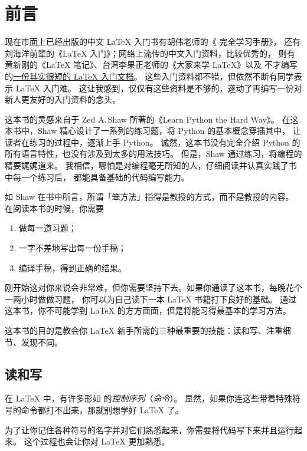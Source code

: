 \chapter{前言}
\label{chap:preface}
现在市面上已经出版的中文 \LaTeX{} 入门书有胡伟老师的《\LaTeXe{} 完全学习手册》，
还有刘海洋前辈的《\LaTeX{} 入门》；网络上流传的中文入门资料，比较优秀的，
则有黄新刚的《\LaTeX{} 笔记》、台湾李果正老师的《大家来学 \LaTeX{}》以及
不才编写的\href{http://liam0205.me/2014/09/08/latex-introduction/}%
  {\uline{一份其实很短的 \LaTeX{} 入门文档}}。
这些入门资料都不错，但依然不断有同学表示 \LaTeX{} 入门难。
这让我感到，仅仅有这些资料是不够的，遂动了再编写一份对新人更友好的入门资料的念头。

这本书的灵感来自于 Zed A.\,Shaw 所著的《Learn Python the Hard Way》。
在这本书中，Shaw 精心设计了一系列的练习题，将 Python 的基本概念穿插其中，
让读者在练习的过程中，逐渐上手 Python。
诚然，这本书没有完全介绍 Python 的所有语言特性，也没有涉及到太多的用法技巧。
但是，Shaw 通过练习，将编程的精要娓娓道来。
我相信，哪怕是对编程毫无所知的人，仔细阅读并认真实践了书中每一个练习后，
都能具备基础的代码编写能力。

如 Shaw 在书中所言，所谓「笨方法」指得是教授的方式，而不是教授的内容。
在阅读本书的时候，你需要
\begin{enumerate}
  \item 做每一道习题；
  \item 一字不差地写出每一份手稿；
  \item 编译手稿，得到正确的结果。
\end{enumerate}
刚开始这对你来说会非常难，但你需要坚持下去。如果你通读了这本书，每晚花个一两小时做做习题，
你可以为自己读下一本 \LaTeX{} 书籍打下良好的基础。
通过这本书，你不可能学到 \LaTeX{} 的方方面面，但是将能习得最基本的学习方法。

这本书的目的是教会你 \LaTeX{} 新手所需的三种最重要的技能：读和写、注重细节、发现不同。

\section*{读和写}
\label{sec:read_and_write}

在 \LaTeX{} 中，有许多形如 
的\emph{控制序列}（\emph{命令}）。
显然，如果你连这些带着特殊符号的命令都打不出来，那就别想学好 \LaTeX{} 了。

为了让你记住各种符号的名字并对它们熟悉起来，你需要将代码写下来并且运行起来。
这个过程也会让你对 \LaTeX{} 更加熟悉。

